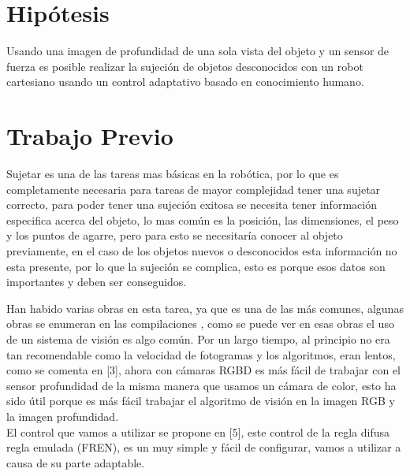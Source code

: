 


\section{Hipótesis}
Usando una imagen de profundidad de una sola vista del objeto y un sensor de fuerza es posible realizar la sujeción de objetos desconocidos con un robot cartesiano usando un control adaptativo basado en conocimiento humano.




\section{Trabajo Previo}
Sujetar es una de las tareas mas básicas en la robótica, por lo que es completamente necesaria para tareas de mayor complejidad tener una sujetar correcto, para poder tener una sujeción exitosa se necesita tener información especifica acerca del objeto, lo mas común es la posición, las dimensiones, el peso y los puntos de agarre, pero para esto se necesitaría conocer al objeto previamente, en el caso de los objetos nuevos o desconocidos esta información no esta presente, por lo que la sujeción se complica, esto es porque esos datos son importantes y deben ser conseguidos.


Han habido varias obras en esta tarea, ya que es una de las más comunes, algunas obras se enumeran en las compilaciones \cite{carlos2013survey}, como se puede ver en esas obras el uso de un sistema de visión es algo común. Por un largo tiempo, al principio no era tan recomendable como la velocidad de fotogramas y los algoritmos, eran lentos, como se comenta en [3], ahora con cámaras RGBD es más fácil de trabajar con el sensor profundidad de la misma manera que usamos un cámara de color, esto ha sido útil porque es más fácil trabajar el algoritmo de visión en la imagen RGB y la imagen profundidad. \\
El control que vamos a utilizar se propone en [5], este control de la regla difusa regla emulada (FREN), es un muy simple y fácil de configurar, vamos a utilizar a causa de su parte adaptable. \\

